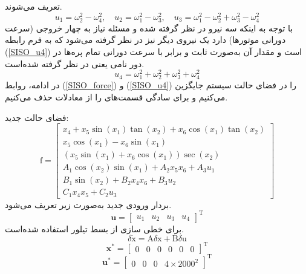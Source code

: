 تعریف می‌شوند.
\begin{equation}\label{SISO_force}
	u_1 = \omega_2^2 - \omega_4^2, \quad
	u_2 = \omega_1^2 - \omega_3^2, \quad
	u_3 = \omega_1^2 - \omega_2^2  + \omega_3^2 - \omega_4^2
\end{equation}
با توجه به اینکه سه نیرو در نظر گرفته ‌شده و مسئله نیاز به چهار خروجی (سرعت دورانی موتورها) دارد یک نیروی دیگر نیز در نظر گرفته ‌می‌شود که به فرم رابطه 
(\ref{SISO_u4})
است و مقدار آن به‌صورت ثابت و برابر با سرعت دورانی تمام پره‌ها در دور نامی یعنی
در نظر گرفته ‌شده‌‌است.
\begin{equation}\label{SISO_u4}
	u_4 = \omega_1^2 + \omega_2^2  + \omega_3^2 + \omega_4^2
\end{equation}
در ادامه، روابط 
(\ref{SISO_force})
و
(\ref{SISO_u4})
را در فضای حالت سیستم جایگزین می‌کنیم و برای سادگی قسمت‌های 
را از معادلات حذف می‌کنیم.

فضای حالت جدید:
\begin{equation}
	\boldsymbol{\mathrm{f}} = \begin{bmatrix}
		x_4 + x_5\sin(x_1)\tan(x_2) + x_6\cos(x_1)\tan(x_2)\\
		x_5\cos(x_1)- x_6\sin(x_1)\\
		(x_5\sin(x_1) + x_6\cos(x_1))\sec(x_2)\\
		A_1\cos(x_2)\sin(x_1) + 
		A_2x_5x_6 + A_3u_1
		\\
		B_1\sin(x_2) + 
		B_2x_4x_6 + B_3u_2\\
		C_1x_4x_5 + 
		C_2u_3
	\end{bmatrix}
\end{equation} 
بردار ورودی جدید به‌صورت زیر تعریف می‌شود.
\begin{equation}
	\boldsymbol{u} = \begin{bmatrix}
		u_1&u_2&u_3&u_4
	\end{bmatrix}^\mathrm{T}
\end{equation}
برای خطی سازی از بسط تیلور استفاده شده‌است.
\begin{equation}
	\delta \dot{\boldsymbol{\mathrm{x}}} = \boldsymbol{\mathrm{A}}\delta \boldsymbol{\mathrm{x}} + \boldsymbol{\mathrm{B}}\delta \boldsymbol{\mathrm{u}}
\end{equation}
\begin{equation}
	\boldsymbol{x^*} = \begin{bmatrix} %
		0& 0 & 0 & 0& 0& 0
	\end{bmatrix}^\mathrm{T}
\end{equation}
\begin{equation}
	\boldsymbol{u^*} = \begin{bmatrix}
		0&0&0&4\times2000^2
	\end{bmatrix}^\mathrm{T}
\end{equation}

